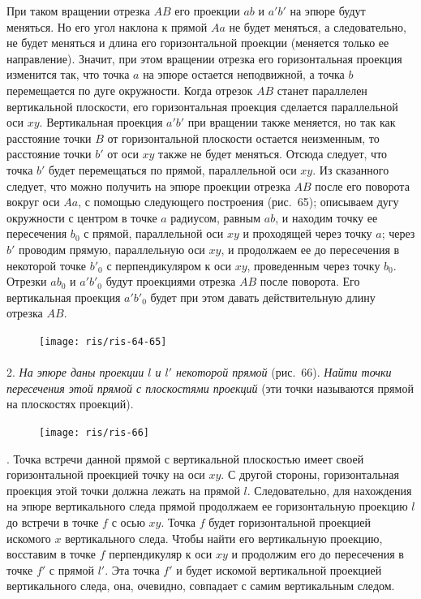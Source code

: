\documentclass[twoside]{book}
\begin{document}
При таком вращении отрезка $AB$ его проекции $ab$ и $a'b'$ на эпюре будут меняться.
Но его угол наклона к прямой $Aa$ не будет меняться, а следовательно, не будет меняться и длина его горизонтальной проекции (меняется только ее направление).
Значит, при этом вращении отрезка его горизонтальная проекция изменится так, что точка $a$ на эпюре остается неподвижной, а точка $b$ перемещается по дуге окружности.
Когда отрезок $AB$ станет параллелен вертикальной плоскости, его горизонтальная проекция сделается параллельной оси $xy$.
Вертикальная проекция $a'b'$ при вращении также меняется, но так как расстояние точки $B$ от горизонтальной плоскости остается неизменным, то расстояние точки $b'$ от оси $xy$ также не будет меняться.
Отсюда следует, что точка $b'$ будет перемещаться по прямой, параллельной оси $xy$.
Из сказанного следует, что можно получить на эпюре проекции отрезка $AB$ после его поворота вокруг оси $Aa$, с помощью следующего построения (рис.~65);
описываем дугу окружности с центром в точке $a$ радиусом, равным $ab$, и находим точку ее пересечения $b_0$ с прямой, параллельной оси $xy$ и проходящей через точку $a$;
через $b'$ проводим прямую, параллельную оси $xy$, и продолжаем ее до пересечения в некоторой точке $b'_0$ с перпендикуляром к оси $xy$, проведенным через точку $b_0$.
Отрезки $ab_0$ и $a'b'_0$ будут проекциями отрезка $AB$ после поворота.
Его вертикальная проекция $a'b'_0$ будет при этом давать действительную длину отрезка $AB$.

\begin{figure}[h!]
\centering
\texttt{[image: ris/ris-64-65]}
\caption{}
\end{figure}

\paragraph{}\label{1938/s61}
 2.
\emph{На эпюре даны проекции $l$ и $l'$ некоторой прямой} (рис.~66).
\emph{Найти точки пересечения этой прямой с плоскостями проекций} (эти точки называются  прямой на плоскостях проекций).

\begin{figure}[h!]
\centering
\texttt{[image: ris/ris-66]}
\caption{}
\end{figure}


.
Точка встречи данной прямой с вертикальной плоскостью имеет своей горизонтальной проекцией точку на оси $xy$. %
С другой стороны, горизонтальная проекция этой точки должна лежать на прямой $l$.
Следовательно, для нахождения на эпюре вертикального следа прямой продолжаем ее горизонтальную проекцию $l$ до встречи в точке $f$ с осью $xy$.
Точка $f$ будет горизонтальной проекцией искомого $x$ вертикального следа.
Чтобы найти его вертикальную проекцию, восставим в точке $f$ перпендикуляр к оси $xy$ и продолжим его до пересечения в точке $f'$ с прямой $l'$.
Эта точка $f'$ и будет искомой вертикальной проекцией вертикального следа, она, очевидно, совпадает с самим вертикальным следом.
\end{document}
